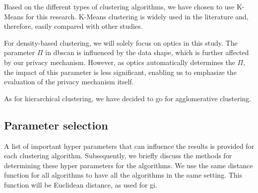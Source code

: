 Based on the different types of clustering algorithms, we have chosen to use K-Means for this research.
K-Means clustering is widely used in the literature and, therefore, easily compared with other studies.

For density-based clustering, we will solely focus on \gls{optics} in this study.
The parameter $\Pi$ in \gls{dbscan} is influenced by the data shape, which is further affected by our privacy mechanism.
However, as \gls{optics} automatically determines the $\Pi$, the impact of this parameter is less significant, enabling us to emphasize the evaluation of the privacy mechanism itself.

As for hierarchical clustering, we have decided to go for agglomerative clustering.


\subsection{Parameter selection}
A list of important hyper parameters that can influence the results is provided for each clustering algorithm. 
{Subsequently, we briefly discuss the methods for determining these hyper parameters for the algorithms. \newline
We use the same distance function for all algorithms to have all the algorithms in the same setting.
This function will be Euclidean distance, as used for \gls{gi}.}
